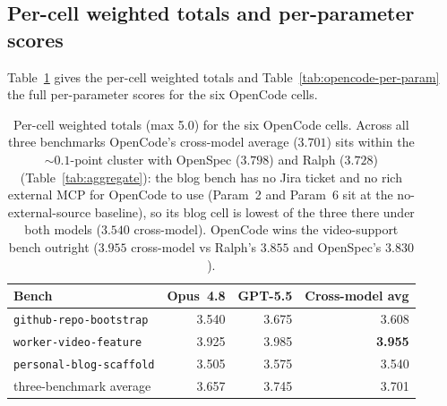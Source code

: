 \subsection{Per-cell weighted totals and per-parameter scores}

Table~\ref{tab:opencode-totals} gives the per-cell weighted totals and
Table~\ref{tab:opencode-per-param} the full per-parameter scores for
the six OpenCode cells.

\begin{table}[h]
\centering
\caption{Per-cell weighted totals (max 5.0) for the six
OpenCode cells. Across all three benchmarks OpenCode's cross-model
average ($3.701$) sits within the ${\sim}0.1$-point cluster with
OpenSpec ($3.798$) and Ralph ($3.728$) (Table~\ref{tab:aggregate}): the
blog bench has no Jira ticket and no rich external MCP for OpenCode to
use (Param~2 and Param~6 sit at the no-external-source baseline), so its
blog cell is lowest of the three there under both models ($3.540$
cross-model). OpenCode wins the video-support bench outright ($3.955$
cross-model vs Ralph's $3.855$ and OpenSpec's $3.830$).}
\label{tab:opencode-totals}
\begin{tabular}{lrrr}
\toprule
Bench & Opus~4.8 & GPT-5.5 & Cross-model avg \\
\midrule
\texttt{github-repo-bootstrap}   & 3.540 & 3.675 & 3.608 \\
\texttt{worker-video-feature}    & 3.925 & 3.985 & \textbf{3.955} \\
\texttt{personal-blog-scaffold}  & 3.505 & 3.575 & 3.540 \\
\midrule
three-benchmark average          & 3.657 & 3.745 & 3.701 \\
\bottomrule
\end{tabular}
\end{table}

